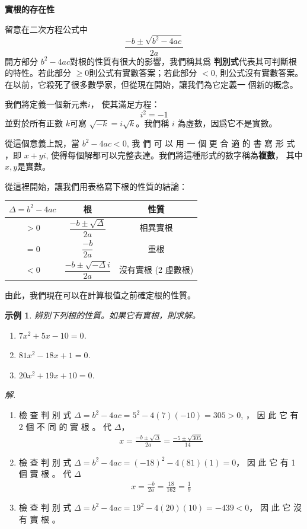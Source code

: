 \documentclass[12pt]{article}
\newtheorem{example}{示例}
\begin{document}
    \begin{center}
        \textbf{實根的存在性}
    \end{center}

    留意在二次方程公式中 $$\frac{-b\pm \sqrt{b^2-4ac}}{2a}$$ 開方部分 $b^2-4ac$對根的性質有很大的影響，我們稱其爲 \textbf{判別式}代表其可判斷根的特性。若此部分 $\geq 0$則公式有實數答案；若此部分 $< 0$, 則公式沒有實數答案。 在以前，它殺死了很多數學家，但從現在開始，讓我們為它定義一
    個新的概念。

    我們將定義一個新元素$i$， 使其滿足方程： $$i^2=-1$$ 並對於所有正數 $k$可寫 $\sqrt{-k}=i\sqrt{k}$。我們稱 $i$ 為虛數，因爲它不是實數。

    從這個意義上說，當 $b^2-4ac<0$, 我 們 可 以 用 一 個 更 合 適 的 書 寫 形 式 ，即 $x+yi$, 使得每個解都可以完整表達。我們將這種形式的數字稱為\textbf{複數}， 其中$x, y$是實數。

    從這裡開始，讓我們用表格寫下根的性質的結論：

    \begin{center}
        \begin{tabular}{|c|c|c|}
            \hline
            $\Delta=b^2-4ac$&根&性質\\
            \hline
            $>0$&$\dfrac{-b\pm\sqrt{\Delta}}{2a}$&相異實根\\
            \hline
            $=0$&$\dfrac{-b}{2a}$&重根\\
            \hline
            $<0$&$\dfrac{-b\pm\sqrt{-\Delta}i}{2a}$&沒有實根 (2 虛數根)\\
            \hline
        \end{tabular}
    \end{center}

    由此，我們現在可以在計算根值之前確定根的性質。
    \begin{example}
        辨別下列根的性質。如果它有實根，則求解。\begin{enumerate}
            \item[(a)] $7x^2+5x-10=0$.
            \item[(b)] $81x^2-18x+1=0$.
            \item[(c)] $20x^2+19x+10=0$.
        \end{enumerate}
    \end{example}

    \textit{ 解.}\begin{enumerate}
        \item[(a)] 檢 查 判 別 式 $\Delta=b^2-4ac=5^2-4(7)(-10)=305>0$, ， 因 此 它 有 2 個 不 同 的 實 根 。 代 $\Delta$， \begin{align*}
            x=\frac{-b\pm\sqrt{\Delta}}{2a}=\frac{-5\pm\sqrt{305}}{14}
        \end{align*}
        \item[(b)] 檢 查 判 別 式 $\Delta=b^2-4ac=(-18)^2-4(81)(1)=0$， 因 此 它 有 1 個 實 根 。 代 $\Delta$\begin{align*}
            x=\frac{-b}{2a}=\frac{18}{162}=\frac{1}{9}
        \end{align*}
        \item[(c)] 檢 查 判 別 式 $\Delta=b^2-4ac=19^2-4(20)(10)=-439<0$， 因 此 它 沒 有 實 根 。
    \end{enumerate}
\end{document}
